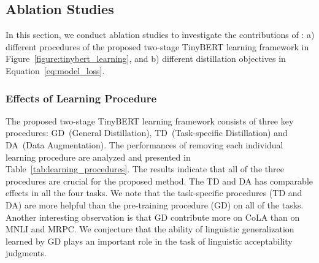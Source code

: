 \documentclass[11pt,a4paper]{article}
\begin{document}
\subsection{Ablation Studies}
In this section, we conduct ablation studies to investigate the contributions of : a) different procedures of the proposed two-stage TinyBERT learning framework in Figure~\ref{figure:tinybert_learning}, and b) different distillation objectives in Equation~\ref{eq:model_loss}.

\subsubsection{Effects of Learning Procedure} The proposed two-stage TinyBERT learning framework consists of three key procedures: GD~(General Distillation), TD~(Task-specific Distillation) and DA~(Data Augmentation). The  performances of removing each individual learning procedure are analyzed and presented in Table~\ref{tab:learning_procedures}. The results indicate that all of the three procedures are crucial for the proposed method. The TD and DA has comparable effects in all the four tasks. We note that the task-specific procedures (TD and DA) are more helpful than the pre-training procedure (GD) on all of the tasks. Another interesting observation is that GD contribute more on CoLA than on MNLI and MRPC. We conjecture that the ability of linguistic generalization~\cite{warstadt2019neural} learned by GD plays an important role in the task of linguistic acceptability judgments.



\begin{table}
\begin{center}
\caption{Ablation studies of different procedures~(i.e., TD, GD, and DA) of the two-stage learning framework. The variants are validated on the dev set.}
\label{tab:learning_procedures}
\vspace{-0.05in}
\end{center} 
\end{table}
\end{document}
